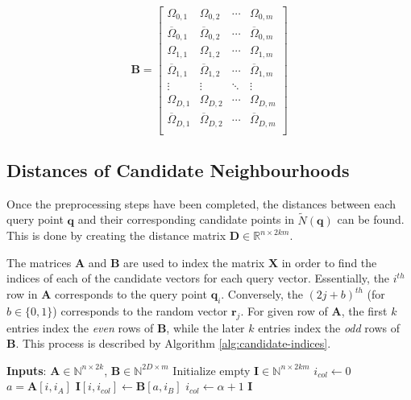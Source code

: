 \documentclass{article}
\newcommand{\brj}{\mathbf{r}_{j}}
\newcommand{\bq}{\mathbf{q}}
\newcommand{\bqi}{\mathbf{q}_{i}}
\newcommand{\Nqt}{\widetilde{N}(\bq)}
\newcommand{\bX}{\mathbf{X}}
\newcommand{\bA}{\mathbf{A}}
\newcommand{\bB}{\mathbf{B}}
\newcommand{\bD}{\mathbf{D}}
\newcommand{\fOmegaCj}[2]{\Omega_{#1,#2}}
\newcommand{\fOmegaFj}[2]{\overline{\Omega}_{#1,#2}}
\newcommand{\Real}{\mathbb{R}}
\newcommand{\Nat}{\mathbb{N}}
\newcommand{\bAIn}{\bA \in \Nat^{n \times 2k}}
\newcommand{\bBIn}{\bB \in \Nat^{2D \times m}}
\newcommand{\bDIn}{\bD \in \Real^{n \times 2km}}
\begin{document}
\begin{equation}
\bB = \begin{bmatrix}
\fOmegaCj{0}{1} & \fOmegaCj{0}{2} & \cdots & \fOmegaCj{0}{m} \\
\fOmegaFj{0}{1} & \fOmegaFj{0}{2} & \cdots & \fOmegaFj{0}{m} \\ 

\fOmegaCj{1}{1} & \fOmegaCj{1}{2} & \cdots & \fOmegaCj{1}{m} \\ 
\fOmegaFj{1}{1} & \fOmegaFj{1}{2} & \cdots & \fOmegaFj{1}{m} \\ 
\vdots&\vdots&\ddots&\vdots\\

\fOmegaCj{D}{1} & \fOmegaCj{D}{2} & \cdots & \fOmegaCj{D}{m} \\ 
\fOmegaFj{D}{1} & \fOmegaFj{D}{2} & \cdots & \fOmegaFj{D}{m} \\ 
\end{bmatrix}
\label{eq:matrixB}
\end{equation}

\subsection{Distances of Candidate Neighbourhoods}
Once the preprocessing steps have been completed, the distances between each query point $\bq$ and their corresponding candidate points in $\Nqt$ can be found. This is done by creating the distance matrix $\bDIn$. 

The matrices $\bA$ and $\bB$ are used to index the matrix $\bX$ in order to find the indices of each of the candidate vectors for each query vector. Essentially, the $i^{th}$ row in $\bA$ corresponds to the query point $\bqi$. Conversely, the ${(2j + {b})}^{th}$ (for $b \in \{0, 1\}$) corresponds to the random vector $\brj$. For given row of $\bA$, the first $k$ entries index the \textit{even} rows of $\bB$, while the later $k$ entries index the \textit{odd} rows of $\bB$. This process is described by Algorithm \ref{alg:candidate-indices}.


\begin{algorithm}[H]
    \caption{Finding the indices of candidate vectors}
    \label{alg:candidate-indices}
    \begin{algorithmic}
        \State \textbf{Inputs}: $\bAIn$, $\bBIn$
        \State Initialize empty $\mathbf{I} \in \Nat^{n \times 2km}$ 
        \State $i_{col} \gets 0$
        \State $a = \bA[i, i_{A}]$
        \State $\mathbf{I}[i, i_{col}] \gets \bB[a, i_{B}]$
        \State $i_{col} \gets \alpha + 1$
        \EndFor
        \EndFor
        \EndFor
    \State \Return $\mathbf{I}$
    \end{algorithmic}
\end{algorithm}
\end{document}
